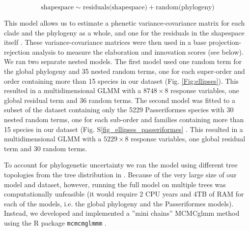 \documentclass[12pt,letterpaper]{article}
\begin{document}
\begin{equation}
\text{shapespace} \mathtt{\sim} \text{residuals(shapespace)} + \text{random(phylogeny)}
\end{equation}

This model allows us to estimate a phenetic variance-covariance matrix for each clade and the phylogeny as a whole, and one for the residuals in the shapespace itself \cite{robinson2013quantifying}.
These variance-covariance matrices were then used in a base projection-rejection analysis to measure the elaboration and innovation scores (see below).
We ran two separate nested models.
The first model used one random term for the global phylogeny and 35 nested random terms, one for each super-order and order containing more than 15 species in our dataset (Fig. \ref{Fig:ellipses}).
This resulted in a multidimensional GLMM with a $8748 \times 8$ response variables, one global residual term and 36 random terms.
The second model was fitted to a subset of the dataset containing only the 5229 Passeriformes species with 30 nested random terms, one for each sub-order and families containing more than 15 species in our dataset (Fig. S\ref{fig_ellipses_passeriformes} .
This resulted in a multidimensional GLMM with a $5229 \times 8$ response variables, one global residual term and 30 random terms.
 
To account for phylogenetic uncertainty we ran the model using different tree topologies from the tree distribution in \cite{jetz2012global}.
Because of the very large size of our model and dataset, however, running the full model on multiple trees was computationally unfeasible (it would require 2 CPU years and 4TB of RAM for each of the models, i.e. the global phylogeny and the Passeriformes models).
Instead, we developed and implemented a ''mini chains'' MCMCglmm method using the R package \texttt{mcmcmglmmm} \cite{mcmcmcglmmm}.
\end{document}
